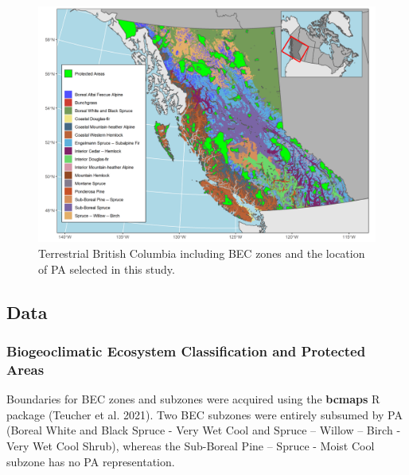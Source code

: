 \documentclass[11pt]{article}
\makeatletter
\def\maxwidth{\ifdim\Gin@nat@width>\linewidth\linewidth
\else\Gin@nat@width\fi}
\let\Oldincludegraphics\includegraphics
\renewcommand{\includegraphics}[1]{\Oldincludegraphics[width=\maxwidth]{#1}}
\makeatother
\begin{document}
\begin{figure}
\hypertarget{fig:study-area}{%
\centering
\includegraphics{figures/bec_map.png}
\caption{Terrestrial British Columbia including BEC zones and the
location of PA selected in this study.}\label{fig:study-area}
}
\end{figure}

\hypertarget{data}{%
\subsection{Data}\label{data}}

\hypertarget{biogeoclimatic-ecosystem-classification-and-protected-areas}{%
\subsubsection{Biogeoclimatic Ecosystem Classification and Protected
Areas}\label{biogeoclimatic-ecosystem-classification-and-protected-areas}}

Boundaries for BEC zones and subzones were acquired using the
\textbf{bcmaps} R package (Teucher et al. 2021). Two BEC subzones were
entirely subsumed by PA (Boreal White and Black Spruce - Very Wet Cool
and Spruce -- Willow -- Birch - Very Wet Cool Shrub), whereas the
Sub-Boreal Pine -- Spruce - Moist Cool subzone has no PA representation.
\end{document}
